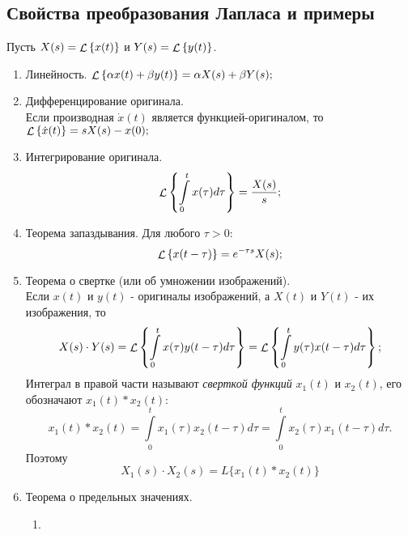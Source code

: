 \documentclass[../../TAU.tex]{subfiles}
\begin{document}
\subsection{Свойства преобразования Лапласа и примеры} %
    Пусть 
    $X(s) = \mathop{\mathcal{L}}\nolimits\left\{x(t)\right\}$ и 
    $Y(s) = \mathop{\mathcal{L}}\nolimits\left\{y(t)\right\}$.
    \begin{enumerate}
        \item Линейность. $\mathop{\mathcal{L}}\nolimits\left\{\alpha x(t) + \beta y(t)\right\} = \alpha X(s) + \beta Y(s);$
        \item Дифференцирование оригинала. \\
            Если производная 
            $\dot x(t)$ 
            является функцией-оригиналом, то 
            $\mathop{\mathcal{L}}\nolimits\left\{\dot x(t)\right\} = sX(s) - x(0);$
        \item Интегрирование оригинала.
            \begin{equation}
                \mathop{\mathcal{L}}\nolimits\left\{\int\limits_0^tx(\tau)d\tau\right\} = \frac{X(s)}{s};
            \end{equation}
        \item Теорема запаздывания. Для любого $\tau>0$:
            \begin{equation}
                \mathop{\mathcal{L}}\nolimits\left\{x(t-\tau)\right\} = e^{-\tau s}X(s);
            \end{equation}
        \item  Теорема о свертке (или об умножении изображений).\\
            Если $x(t)$ и $y(t)$ - оригиналы изображений, а $X(t)$ и $Y(t)$ - их изображения, то
            \begin{equation}
                X(s)\cdot Y(s) = \mathop{\mathcal{L}}\nolimits\left\{\int\limits_0^tx(\tau)y(t-\tau)d\tau\right\} = \mathop{\mathcal{L}}\nolimits\left\{\int\limits_0^ty(\tau)x(t-\tau)d\tau\right\};
            \end{equation}
            Интеграл в правой части называют {\it сверткой функций} $x_1(t)$ и $x_2(t)$, его обозначают $x_1(t) * x_2(t)$:
            \begin{equation}
                x_1(t)*x_2(t) = \int\limits_0^t x_1(\tau) x_2(t-\tau) d{\tau} = \int\limits_0^t x_2(\tau) x_1(t-\tau)d\tau.
            \end{equation}
            Поэтому 
            \begin{equation}
                X_1(s) \cdot X_2(s) = L\{x_1(t) * x_2(t)\}
            \end{equation}
        \item Теорема о предельных значениях.
            \begin{enumerate}[label*={\arabic*}]
                \item 

\end{enumerate}
\end{enumerate}
\end{document}
